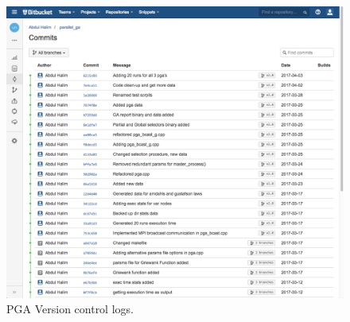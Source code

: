 \begin{figure}[!htb]
  \center
  \includegraphics[width=\linewidth]{figs/git_logs.png}
  \caption{PGA Version control logs.}
  \label{fig:git_logs}
\end{figure}

